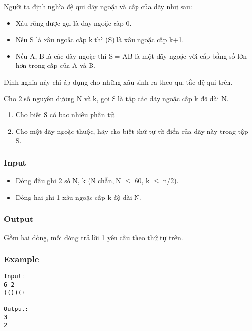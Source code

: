 

Người ta định nghĩa đệ qui dãy ngoặc và cấp của dãy như sau:
\begin{itemize}
	\item Xâu rỗng được gọi là dãy ngoặc cấp 0.
	\item Nếu S là xâu ngoặc cấp k thì (S) là xâu ngoặc cấp k+1.
	\item Nếu A, B là các dãy ngoặc thì S = AB là một dãy ngoặc với cấp bằng số lớn hơn trong cấp của A và B.
\end{itemize}

Định nghĩa này chỉ áp dụng cho những xâu sinh ra theo qui tắc đệ qui trên.

Cho 2 số nguyên dương N và k, gọi S là tập các dãy ngoặc cấp k độ dài N.
\begin{enumerate}
	\item Cho biết S có bao nhiêu phần tử.
	\item Cho một dãy ngoặc thuộc, hãy cho biết thứ tự từ điển của dãy này trong tập S.
\end{enumerate}

\subsubsection{Input}
\begin{itemize}
	\item Dòng đầu ghi 2 số N, k (N chẵn, N  $\le$  60, k  $\le$  n/2).
	\item Dòng hai ghi 1 xâu ngoặc cấp k độ dài N.
\end{itemize}

\subsubsection{Output}

Gồm hai dòng, mỗi dòng trả lời 1 yêu cầu theo thứ tự trên.

\subsubsection{Example}
\begin{verbatim}
Input:
6 2
(())()

Output:
3
2
\end{verbatim}
